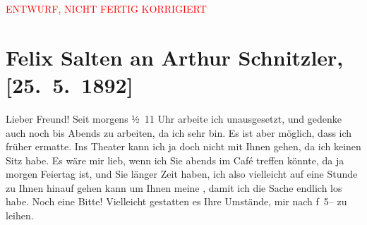 
\begin{center}
            \textcolor{red}{ENTWURF, NICHT FERTIG KORRIGIERT}
                      \end{center}
            
         
         \renewcommand{\erwaehntePersonen}{Personen: Leopold Weiss}
         \renewcommand{\erwaehnteOrte}{Orte: Wien}
         \renewcommand{\erwaehnteWerke}{Werke: Anatol, Muza}
               \section[Felix Salten an Arthur Schnitzler, {[}25. 5. 1892{]}]{ Felix Salten an Arthur Schnitzler, {[}25. 5. 1892{]}}\nopagebreak{}\rehead{ }\begin{ledgroupsized}[t]{13cm}\normalsize\beginnumbering \toendnotes[C]{\smallbreak\pagebreak[2]} 
\toendnotes[C]{\smallbreak}\pstart
           \noindent{}{\pb}Lieber Freund! Seit morgens ½ 11 Uhr arbeite ich unausgesetzt, und
               gedenke auch noch bis Abends zu arbeiten, da ich sehr \label{K_L03109-1v}\label{K_L03109-1h} bin. Es ist aber
               möglich, dass ich früher ermatte. \pend
           \pstart
           Ins Theater kann ich ja doch nicht mit Ihnen gehen, da ich keinen Sitz habe. Es wäre
               mir lieb, wenn ich Sie abends im Café {\pb}treffen könnte, da \strikeout{\textcolor{gray}{au}} ja morgen Feiertag ist, und Sie
               länger Zeit haben, ich also vielleicht auf eine Stunde zu Ihnen hinauf gehen kann um
               Ihnen meine \label{K_L03109-2v}\label{K_L03109-2h},
               damit ich die Sache endlich los habe. \pend
           \pstart
           Noch eine Bitte! Vielleicht gestatten es Ihre Umstände, mir nach f 5– zu leihen.

\end{ledgroupsized}

